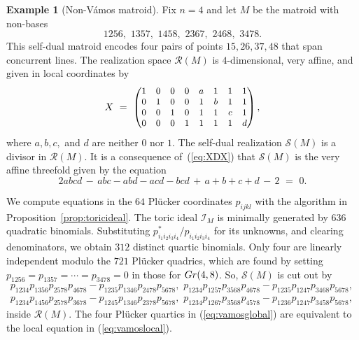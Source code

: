 \documentclass[12pt]{extarticle}
\theoremstyle{definition}
\newtheorem{example}[theorem]{Example}
\numberwithin{theorem}{section}
\theoremstyle{plain}\newtheorem{ithm}{Theorem}
\begin{document}
\begin{example}[Non-V\'amos matroid] \label{ex:nonvamos}
Fix $n=4$ and let $M$ be the matroid with  non-bases
$$ 1256,\,\, 1357, \,\,1458, \,\,2367, \,\,2468, \,\,3478. $$
This self-dual matroid encodes four pairs of points $15,26,37,48$
that span  concurrent lines.
The realization space $\mathcal{R}(M)$ is $4$-dimensional, very affine, and given in local coordinates by
$$ X \,\, = \,\, \begin{small} \begin{pmatrix}
1 & 0 & 0 & 0 & a & 1 & 1 & 1 \\
0 & 1 & 0 & 0 & 1 & b & 1 & 1 \\
0 & 0 & 1 & 0 & 1 & 1 & c & 1 \\
0 & 0 & 0 & 1 & 1 & 1 & 1 & d \\
\end{pmatrix}, \end{small}
$$
where $a,b,c,$ and $d$ are neither $0$ nor $1$. The self-dual realization $\mathcal{S}(M)$ is a divisor in $\mathcal{R}(M)$. It is a consequence of~(\ref{eq:XDX}) that $\mathcal{S}(M)$ is the very affine threefold given by the equation
\begin{equation}
\label{eq:vamoslocal} 2 a b c d \,-\, abc - abd - acd-bcd\,+\,a+b+c+d \,-\,2 \,\, = \,\, 0 .
\end{equation}

We compute equations in the $64$ Pl\"ucker coordinates $p_{ijkl}$ with the
algorithm in Proposition~\ref{prop:toricideal}.
The toric ideal $\mathcal{I}_M$ is minimally generated by
$636$ quadratic binomials. Substituting $p^*_{i_1i_2i_3i_4} /p_{i_1 i_2i_3i_4}$
for its unknowns, and clearing denominators, we obtain $312$ distinct
quartic binomials. Only four
are linearly independent modulo the $721$ Pl\"ucker quadrics, which are
found by setting  $p_{1256} = p_{1357}= \cdots = p_{3478} = 0$ in those for ${\rm Gr}(4,8)$. So, $\mathcal{S}(M)$ is cut out by
\begin{equation}
\label{eq:vamosglobal}
\begin{matrix} p_{1234} p_{1356} p_{2578} p_{4678} - p_{1235} p_{1346} p_{2478} p_{5678},\,\,
 p_{1234} p_{1257} p_{3568} p_{4678}-p_{1235}p_{1247} p_{3468} p_{5678},\, \\
 p_{1234} p_{1456} p_{2578} p_{3678} - p_{1245} p_{1346} p_{2378} p_{5678} , \,\,
 p_{1234} p_{1267} p_{3568} p_{4578}-p_{1236} p_{1247} p_{3458} p_{5678}, \end{matrix}
 \end{equation}
inside $\mathcal{R}(M)$. The four Pl\"ucker quartics
  in (\ref{eq:vamosglobal}) are equivalent to the local equation in (\ref{eq:vamoslocal}).
\end{example}
\end{document}

